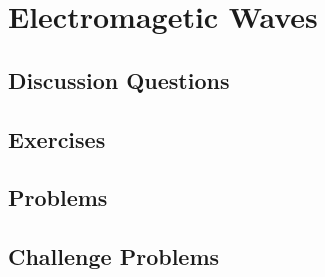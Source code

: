 
\chapter{Electromagetic Waves}

\section{Discussion Questions}

\section{Exercises}

\section{Problems}

\section{Challenge Problems}

